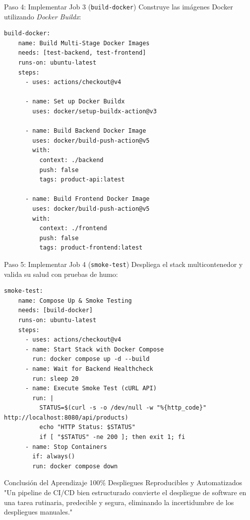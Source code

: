 \documentclass[aspectratio=169]{beamer}
\begin{document}
\begin{frame}[fragile]{Paso 4: Implementar Job 3 (\texttt{build-docker})}
  \vspace{0.05cm}
  Construye las imágenes Docker utilizando \textit{Docker Buildx}:
  \vspace{0.1cm}
  \begin{lstlisting}[style=yamltiny]
  build-docker:
    name: Build Multi-Stage Docker Images
    needs: [test-backend, test-frontend]
    runs-on: ubuntu-latest
    steps:
      - uses: actions/checkout@v4

      - name: Set up Docker Buildx
        uses: docker/setup-buildx-action@v3

      - name: Build Backend Docker Image
        uses: docker/build-push-action@v5
        with:
          context: ./backend
          push: false
          tags: product-api:latest

      - name: Build Frontend Docker Image
        uses: docker/build-push-action@v5
        with:
          context: ./frontend
          push: false
          tags: product-frontend:latest
  \end{lstlisting}
\end{frame}

\begin{frame}[fragile]{Paso 5: Implementar Job 4 (\texttt{smoke-test})}
  \vspace{-0.1cm}
  Despliega el stack multicontenedor y valida su salud con pruebas de humo:
  \vspace{0.05cm}
  \begin{lstlisting}[style=yamltiny]
  smoke-test:
    name: Compose Up & Smoke Testing
    needs: [build-docker]
    runs-on: ubuntu-latest
    steps:
      - uses: actions/checkout@v4
      - name: Start Stack with Docker Compose
        run: docker compose up -d --build
      - name: Wait for Backend Healthcheck
        run: sleep 20
      - name: Execute Smoke Test (cURL API)
        run: |
          STATUS=$(curl -s -o /dev/null -w "%{http_code}" http://localhost:8080/api/products)
          echo "HTTP Status: $STATUS"
          if [ "$STATUS" -ne 200 ]; then exit 1; fi
      - name: Stop Containers
        if: always()
        run: docker compose down
  \end{lstlisting}
\end{frame}

\contentSlideQuoteStat
  {Conclusión del Aprendizaje}
  {100\%}
  {Despliegues Reproducibles y Automatizados}
  {"Un pipeline de CI/CD bien estructurado convierte el despliegue de software en una tarea rutinaria, predecible y segura, eliminando la incertidumbre de los despliegues manuales."}
\end{document}
